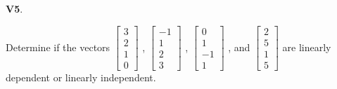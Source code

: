 \documentclass{article}
\newenvironment{problem}[1]
{
  \begin{flushleft}
  \textbf{#1}.
  \ignorespaces
}
{
  \end{flushleft}
}
\begin{document}
\begin{problem}{V5}
Determine if the vectors
\( \begin{bmatrix} 3 \\ 2 \\ 1 \\ 0 \end{bmatrix} \) ,
\( \begin{bmatrix} -1 \\ 1 \\ 2 \\ 3 \end{bmatrix} \) ,
\( \begin{bmatrix} 0 \\ 1 \\ -1 \\ 1 \end{bmatrix} \) , and
\( \begin{bmatrix} 2 \\ 5 \\ 1 \\ 5 \end{bmatrix} \)
are linearly dependent or linearly independent.
\end{problem}
\end{document}
